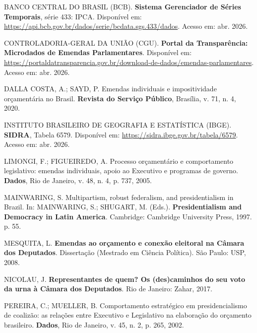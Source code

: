 \documentclass[12pt,a4paper,oneside]{article}
\begin{document}
\begin{singlespace}
\noindent\hangindent=1.25cm
BANCO CENTRAL DO BRASIL (BCB). \textbf{Sistema Gerenciador de Séries
Temporais}, série 433: IPCA. Disponível em:
\url{https://api.bcb.gov.br/dados/serie/bcdata.sgs.433/dados}.
Acesso em: abr. 2026.\par\smallskip

\noindent\hangindent=1.25cm
CONTROLADORIA-GERAL DA UNIÃO (CGU). \textbf{Portal da Transparência:
Microdados de Emendas Parlamentares}. Disponível em:
\url{https://portaldatransparencia.gov.br/download-de-dados/emendas-parlamentares}.
Acesso em: abr. 2026.\par\smallskip

\noindent\hangindent=1.25cm
DALLA COSTA, A.; SAYD, P. Emendas individuais e impositividade
orçamentária no Brasil. \textbf{Revista do Serviço Público},
Brasília, v. 71, n. 4, 2020.\par\smallskip

\noindent\hangindent=1.25cm
INSTITUTO BRASILEIRO DE GEOGRAFIA E ESTATÍSTICA (IBGE).
\textbf{SIDRA}, Tabela 6579. Disponível em:
\url{https://sidra.ibge.gov.br/tabela/6579}. Acesso em: abr. 2026.
\par\smallskip

\noindent\hangindent=1.25cm
LIMONGI, F.; FIGUEIREDO, A. Processo orçamentário e comportamento
legislativo: emendas individuais, apoio ao Executivo e programas de
governo. \textbf{Dados}, Rio de Janeiro, v. 48, n. 4,
p. 737, 2005.\par\smallskip

\noindent\hangindent=1.25cm
MAINWARING, S. Multipartism, robust federalism, and presidentialism
in Brazil. In: MAINWARING, S.; SHUGART, M. (Eds.).
\textbf{Presidentialism and Democracy in Latin America}. Cambridge:
Cambridge University Press, 1997. p. 55.\par\smallskip

\noindent\hangindent=1.25cm
MESQUITA, L. \textbf{Emendas ao orçamento e conexão eleitoral na
Câmara dos Deputados}. Dissertação (Mestrado em Ciência Política).
São Paulo: USP, 2008.\par\smallskip

\noindent\hangindent=1.25cm
NICOLAU, J. \textbf{Representantes de quem? Os (des)caminhos do seu
voto da urna à Câmara dos Deputados}. Rio de Janeiro: Zahar, 2017.
\par\smallskip

\noindent\hangindent=1.25cm
PEREIRA, C.; MUELLER, B. Comportamento estratégico em
presidencialismo de coalizão: as relações entre Executivo e
Legislativo na elaboração do orçamento brasileiro. \textbf{Dados},
Rio de Janeiro, v. 45, n. 2, p. 265, 2002.\par\smallskip


\end{singlespace}
\end{document}
